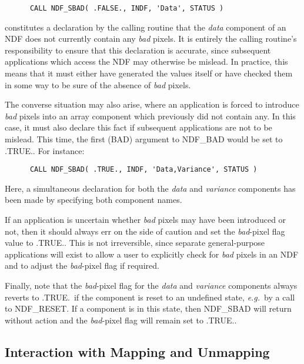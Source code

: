 \documentclass[twoside,11pt]{article}
\newcommand{\htmlref}[2]{#1}
\newcommand{\xlabel}[1]{}
\newcommand{\st}[1]{{\em{#1}}}
\begin{document}
\small
\begin{verbatim}
      CALL NDF_SBAD( .FALSE., INDF, 'Data', STATUS )
\end{verbatim}
\normalsize

constitutes a declaration by the calling routine that the \st{data\/} component
of an NDF does not currently contain any \st{bad\/} pixels. 
It is entirely the calling routine's responsibility to ensure that this
declaration is accurate, since subsequent applications which access the NDF may
otherwise be mislead. 
In practice, this means that it must either have generated the values itself
or have checked them in some way to be sure of the absence of \st{bad\/}
pixels. 

The converse situation may also arise, where an application is forced to 
introduce \st{bad\/} pixels into an array component which previously did not 
contain any.
In this case, it must also declare this fact if subsequent applications are not
to be mislead. 
This time, the first (BAD) argument to \htmlref{NDF\_BAD}{NDF_BAD} would be set to .TRUE..
For instance:

\small
\begin{verbatim}
      CALL NDF_SBAD( .TRUE., INDF, 'Data,Variance', STATUS )
\end{verbatim}
\normalsize

Here, a simultaneous declaration for both the \st{data\/} and \st{variance\/}
components has been made by specifying both component names.

If an application is uncertain whether \st{bad\/} pixels may have been
introduced or not, then it should always err on the side of caution and set the
\st{bad\/}-pixel flag value to .TRUE.. 
This is not irreversible, since separate general-purpose applications will
exist to allow a user to explicitly check for \st{bad\/} pixels in an NDF and
to adjust the \st{bad\/}-pixel flag if required. 

Finally, note that the \st{bad\/}-pixel flag for the \st{data\/} and
\st{variance\/} components always reverts to .TRUE.\ if the component
is reset to 
an undefined state, \st{e.g.}\ by a call to \htmlref{NDF\_RESET}{NDF_RESET}. 
If a component is in this state, then NDF\_SBAD will return without action
and the \st{bad\/}-pixel flag will remain set to .TRUE.. 

\subsection{\xlabel{interaction_with_mapping_and_unmapping}\label{ss:mappinginteract}Interaction with Mapping and Unmapping}
\end{document}
